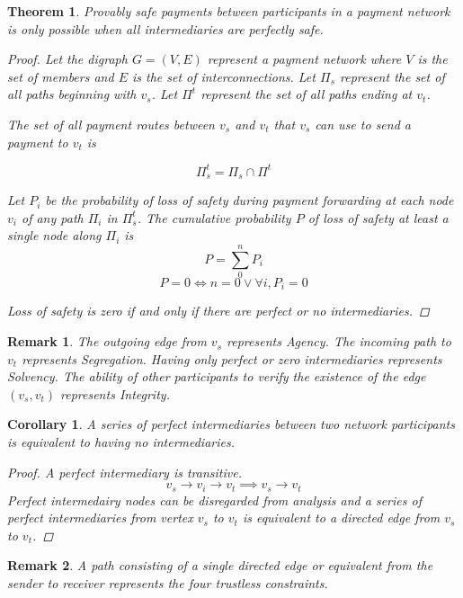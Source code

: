 \documentclass[12pt,a4paper]{article}
\begin{document}
\newtheorem{theorem}{Theorem}
\begin{theorem}
Provably safe payments between participants in a payment network is only possible when all intermediaries are perfectly safe.
\begin{proof}
Let the digraph $G=(V,E)$ represent a payment network where $V$ is the set of members and $E$ is the set of interconnections. Let $\Pi_s$ represent the set of all paths beginning with $v_s$. Let $\Pi^t$ represent the set of all paths ending at $v_t$. 

The set of all payment routes between $v_s$ and $v_t$ that $v_s$ can use to send a payment to $v_t$ is

\begin{equation}
  \Pi_s^t = \Pi_s \cap \Pi^t  
\end{equation}

Let $P_i$ be the probability of loss of safety during payment forwarding at each node $v_i$ of any path $\Pi_i$ in $\Pi_s^t$.
The cumulative probability $P$ of loss of safety at least a single node along $\Pi_i$ is 
\begin{equation}
    P = \sum_0^n P_i 
\end{equation}
\begin{equation}
    P = 0 \iff n = 0 \lor \forall i, P_i = 0
\label{T1eq1}
\end{equation}

Loss of safety is zero if and only if there are perfect or no intermediaries.
\end{proof}
\end{theorem}
\newtheorem*{remark}{Remark}
\begin{remark}{} The outgoing edge from $v_s$ represents \emph{Agency}. The incoming path to $v_t$ represents \emph{Segregation}. Having only perfect or zero intermediaries represents \emph{Solvency}. The ability of other participants to verify the existence of the edge $(v_s,v_t)$ represents \emph{Integrity}.
\end{remark}
\newtheorem{corollary}{Corollary}
\begin{corollary}
A series of perfect intermediaries between two network participants is equivalent to having no intermediaries.
\begin{proof}
A perfect intermediary is transitive. 
\begin{equation}
    v_s \rightarrow v_i \rightarrow v_t \implies v_s \rightarrow v_t
\end{equation}
Perfect intermedairy nodes can be disregarded from analysis and a series of perfect intermediaries from vertex $v_s$ to $v_t$ is equivalent to a   directed edge from $v_s$ to $v_t$. 
\end{proof}
\end{corollary}
\begin{remark}
A path consisting of a single directed edge or equivalent from the sender to  receiver represents the four trustless constraints. 
\end{remark}
\newpage
\end{document}
